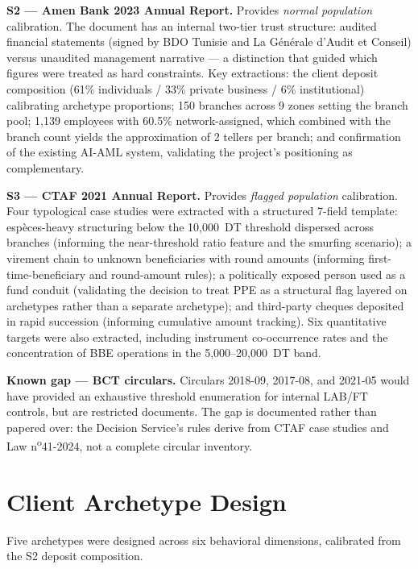 \textbf{S2 --- Amen Bank 2023 Annual Report.} Provides \emph{normal population} calibration. The document has an internal two-tier trust structure: audited financial statements (signed by BDO Tunisie and La G\'en\'erale d'Audit et Conseil) versus unaudited management narrative --- a distinction that guided which figures were treated as hard constraints. Key extractions: the client deposit composition (61\% individuals / 33\% private business / 6\% institutional) calibrating archetype proportions; 150 branches across 9 zones setting the branch pool; 1{,}139 employees with 60.5\% network-assigned, which combined with the branch count yields the approximation of 2 tellers per branch; and confirmation of the existing AI-AML system, validating the project's positioning as complementary.

\textbf{S3 --- CTAF 2021 Annual Report.} Provides \emph{flagged population} calibration. Four typological case studies were extracted with a structured 7-field template: esp\`eces-heavy structuring below the 10{,}000~DT threshold dispersed across branches (informing the near-threshold ratio feature and the smurfing scenario); a virement chain to unknown beneficiaries with round amounts (informing first-time-beneficiary and round-amount rules); a politically exposed person used as a fund conduit (validating the decision to treat PPE as a structural flag layered on archetypes rather than a separate archetype); and third-party cheques deposited in rapid succession (informing cumulative amount tracking). Six quantitative targets were also extracted, including instrument co-occurrence rates and the concentration of BBE operations in the 5{,}000--20{,}000~DT band.

\textbf{Known gap --- BCT circulars.} Circulars 2018-09, 2017-08, and 2021-05 would have provided an exhaustive threshold enumeration for internal LAB/FT controls, but are restricted documents. The gap is documented rather than papered over: the Decision Service's rules derive from CTAF case studies and Law n\textsuperscript{o}41-2024, not a complete circular inventory.

\section{Client Archetype Design}

Five archetypes were designed across six behavioral dimensions, calibrated from the S2 deposit composition.

